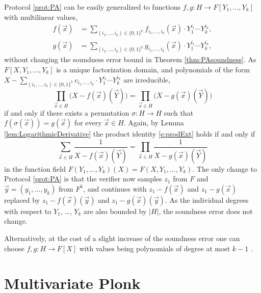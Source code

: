 \documentclass[11pt]{article}
\theoremstyle{definition}
\theoremstyle{remark}
\begin{document}
Protocol \ref{prot:PA} can be easily generalized to functions $f,g: H\longrightarrow F[Y_1,\ldots,Y_k]$ with multilinear values, 
\begin{align*}
f(\vec x) &= \sum_{(i_1,\ldots, i_k)\in\{0,1\}^k} f_{i_1,\ldots, i_k}(\vec x)\cdot Y_1^{i_1}\cdots Y_k^{i_k},
\\
g(\vec x) &= \sum_{(i_1,\ldots, i_k)\in\{0,1\}^k} g_{i_1,\ldots, i_k}(\vec x)\cdot Y_1^{i_1}\cdots Y_k^{i_k},
\end{align*}
without changing the soundness error bound in Theorem \ref{thm:PAsoundness}.
As $F[X,Y_1,\ldots, Y_k]$ is a unique factorization domain, and polynomials of the form $X -  \sum_{(i_1,\ldots, i_k)\in\{0,1\}^k} c_{i_1,\ldots, i_k}\cdot Y_1^{i_1}\cdots Y_k^{i_k}$ are irreducible,
\begin{equation}
\label{e:prodExt}
\prod_{\vec x\in H} \Big(X -  f(\vec x)(\vec Y)\big) = \prod_{\vec x\in H} \big(X - g(\vec x)(\vec Y)\big)
\end{equation}
if and only if there exists a permutation $\sigma:H\rightarrow H$ such that $f(\sigma(\vec x)) = g(\vec x)$ for every $\vec x\in H$.
Again, by Lemma \ref{lem:LogarithmicDerivative} the product identity \eqref{e:prodExt} holds if and only if 
\begin{equation}
\label{e:sumExt}
\sum_{\vec x\in H} \frac{1}{X -  f(\vec x)(\vec Y)} = \prod_{\vec x\in H} \frac{1}{X - g(\vec x)(\vec Y)}
\end{equation}
in the function field $F(Y_1,\ldots, Y_k)(X) = F(X,Y_1,\ldots, Y_k)$.
The only change to Protocol \ref{prot:PA} is that the verifier now samples $z_1$ from $F$ and $\vec y = (y_1,\ldots, y_k)$ from $F^k$, and continues with $z_1 - f(\vec x)$ and $z_1 - g(\vec x)$ replaced by $z_1 - f(\vec x)(\vec y)$ and $z_1 - g(\vec x)(\vec y)$.
As the individual degrees with respect to $Y_1$, \ldots, $Y_k$ are also bounded by $|H|$, the soundness error does not change.

Alternatively, at the cost of a slight increase of the soundness error one can choose $f, g: H\longrightarrow F[X]$ with values being polynomials of degree at most $k-1$ . 

\section{Multivariate Plonk}
\end{document}
